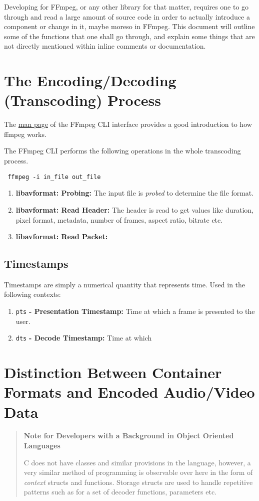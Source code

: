 \documentclass{article}
\begin{document}
Developing for FFmpeg, or any other library for that matter, requires one to go through and read a large amount of source code in order to actually introduce a component or change in it, maybe moreso in FFmpeg. This document will outline some of the functions that one shall go through, and explain some things that are not directly mentioned within inline comments or documentation.

\section{The Encoding/Decoding (Transcoding) Process}



The \href{https://ffmpeg.org/ffmpeg.html\#toc-Detailed-description}{man page} 
of the FFmpeg CLI interface provides a good introduction to how ffmpeg works.

The FFmpeg CLI performs the following operations in the whole transcoding process.

\texttt{ ffmpeg -i in\_file out\_file }

\begin{enumerate}
\item \textbf{libavformat: Probing:} The input file is \emph{probed} to 
      determine the file format.
\item \textbf{libavformat: Read Header:} The header is read to get values like 
      duration, pixel format, metadata, number of frames, aspect ratio, bitrate 
      etc.
\item \textbf{libavformat: Read Packet:} 
\end{enumerate}

\subsection{Timestamps}

Timestamps are simply a numerical quantity that represents time. Used in the following contexts:

\begin{enumerate}
\item \texttt{pts} \textbf{- Presentation Timestamp:} Time at which a frame is 
      presented to the user.
\item \texttt{dts} \textbf{- Decode Timestamp:} Time at which 
\end{enumerate}

\section{Distinction Between Container Formats and Encoded Audio/Video Data}
\begin{quote}
\textbf{Note for Developers with a Background in Object Oriented Languages}

C does not have classes and similar provisions in the language, however, a very 
similar method of programming is observable over here in the form of 
\emph{context} structs and functions. Storage structs are used to handle 
repetitive patterns such as for a set of decoder functions, parameters etc.


\end{quote}
\end{document}
